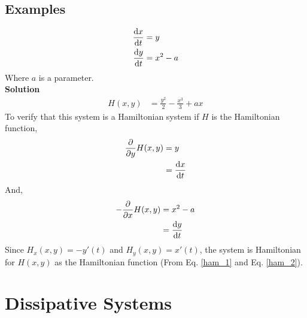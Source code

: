 \documentclass[12pt,1in]{article}
\newenvironment{Example}[2][Example]{\begin{trivlist}
		\item[\hskip \labelsep {\bfseries #1}\hskip \labelsep {\bfseries #2.}]}{\end{trivlist}}
\begin{document}
\subsection{Examples}
\begin{Example}{1}
	\begin{align*}
	\derivative{x}{t} &= y \\
	\derivative{y}{t} &= x^2 - a
	\end{align*}
	Where $a$ is a parameter. \\
	{\bfseries Solution\\}
	\begin{align*}
	H(x,y) &= \frac{y^2}{2} - \frac{x^3}{3} + ax
	\end{align*}
	To verify that this system is a Hamiltonian system if $H$ is the Hamiltonian function,
	\begin{align*}
	\frac{\partial}{\partial y}H(x,y) &= y\\
	&= \derivative{x}{t}
	\end{align*}
	And,
	\begin{align*}
	- \frac{\partial}{\partial x} H(x,y) &= x^2 - a\\
	&= \derivative{y}{t}
	\end{align*}
	Since $H_x(x,y) = - y'(t)$ and $H_y(x,y) = x'(t)$, the system is Hamiltonian for $H(x,y)$ as the Hamiltonian function (From Eq. \ref{ham_1} and Eq. \ref{ham_2}).
\end{Example}
\section{Dissipative Systems}



\end{document}
